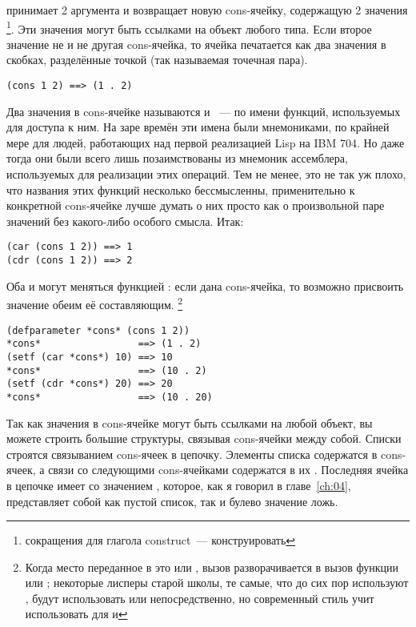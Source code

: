  принимает 2 аргумента и возвращает новую cons-ячейку, содержащую 2 значения
\footnote{ сокращения для глагола construct~--- конструировать}. Эти значения
могут быть ссылками на объект любого типа. Если второе значение не  и не другая
cons-ячейка, то ячейка печатается как два значения в скобках, разделённые точкой (так
называемая точечная пара).

\begin{lstlisting}
(cons 1 2) ==> (1 . 2)
\end{lstlisting}

Два значения в cons-ячейке называются  и ~--- по имени функций,
используемых для доступа к ним. На заре времён эти имена были мнемониками, по крайней мере
для людей, работающих над первой реализацией Lisp на IBM 704. Но даже тогда они были всего
лишь позаимствованы из мнемоник ассемблера, используемых для реализации этих операций. Тем
не менее, это не так уж плохо, что названия этих функций несколько бессмысленны,
применительно к конкретной cons-ячейке лучше думать о них просто как о произвольной паре
значений без какого-либо особого смысла. Итак:

\begin{lstlisting}
(car (cons 1 2)) ==> 1
(cdr (cons 1 2)) ==> 2
\end{lstlisting}

Оба  и  могут меняться функцией : если дана cons-ячейка, то
возможно присвоить значение обеим её составляющим. \footnote{Когда место переданное в
   это  или , вызов  разворачивается в вызов
  функции  или ; некоторые лисперы старой школы, те самые, что
  до сих пор используют , будут использовать  или 
  непосредственно, но современный стиль учит использовать  для  и
  }

\begin{lstlisting}
(defparameter *cons* (cons 1 2))
*cons*                 ==> (1 . 2)
(setf (car *cons*) 10) ==> 10
*cons*                 ==> (10 . 2)
(setf (cdr *cons*) 20) ==> 20
*cons*                 ==> (10 . 20)
\end{lstlisting}

Так как значения в cons-ячейке могут быть ссылками на любой объект, вы можете строить большие
структуры, связывая cons-ячейки между собой. Списки строятся связыванием cons-ячеек в
цепочку. Элементы списка содержатся в  cons-ячеек, а связи со следующими
cons-ячейками содержатся в их . Последняя ячейка в цепочке имеет  со
значением , которое, как я говорил в главе~\ref{ch:04}, представляет собой как
пустой список, так и булево значение ложь.

